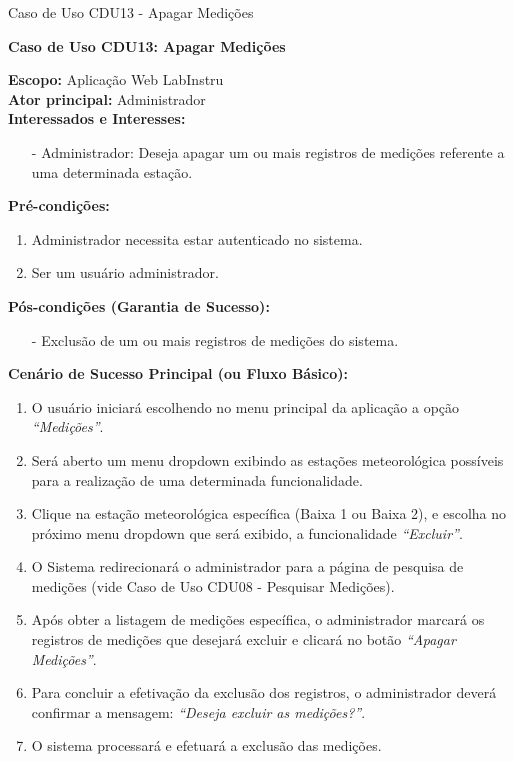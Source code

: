 \begin{quadro}[H]
	\centering
	\caption{Caso de Uso CDU13 - Apagar Medições}

	\begin{framed}

		\textbf{Caso de Uso CDU13: Apagar Medições}\\

		\begin{flushleft}

		\textbf{Escopo:} Aplicação Web LabInstru\\

		\textbf{Ator principal:} Administrador\\

		\textbf{Interessados e Interesses:}
		\begin{itemize}
			\item[-] Administrador: Deseja apagar um ou mais registros de medições referente a uma determinada estação.
		\end{itemize}

		\textbf{Pré-condições:}\\
			 \begin{enumerate}
			 	\item{Administrador necessita estar autenticado no sistema.}
			 	\item{Ser um usuário administrador.}
			 \end{enumerate}

		\textbf{Pós-condições (Garantia de Sucesso):}
		\begin{itemize}
			\item[-] Exclusão de um ou mais registros de medições do sistema.
		\end{itemize}

		\textbf{Cenário de Sucesso Principal (ou Fluxo Básico):}
			\begin{enumerate}
				\item{O usuário iniciará escolhendo no menu principal da aplicação a opção \textit{``Medições''}.}
				\item{Será aberto um menu dropdown exibindo as estações meteorológica possíveis para a realização de uma determinada funcionalidade.}
				\item{Clique na estação meteorológica específica (Baixa 1 ou Baixa 2), e escolha no próximo menu dropdown que será exibido, a funcionalidade \textit{``Excluir''}.}
			 	\item{O Sistema redirecionará o administrador para a página de pesquisa de medições (vide Caso de Uso CDU08 - Pesquisar Medições).}
			 	\item{Após obter a listagem de medições específica, o administrador marcará os registros de medições que desejará excluir e clicará no botão \textit{``Apagar Medições''}.}
			 	\item{Para concluir a efetivação da exclusão dos registros, o administrador deverá confirmar a mensagem: \textit{``Deseja excluir as medições?''}.}
			 	\item{O sistema processará e efetuará a exclusão das medições.}
			 \end{enumerate}


\end{flushleft}
\end{framed}
\end{quadro}
